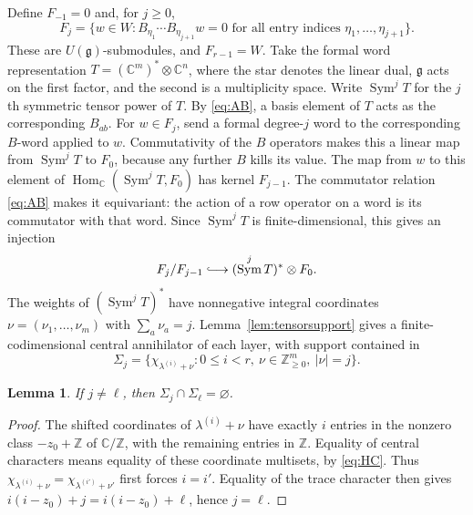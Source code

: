 \documentclass[11pt,a4paper]{article}
\numberwithin{equation}{section}
\newtheorem{lemma}[theorem]{Lemma}
\theoremstyle{definition}
\newcommand{\C}{\mathbb C}
\newcommand{\Z}{\mathbb Z}
\newcommand{\g}{\mathfrak g}
\DeclareMathOperator{\Sym}{Sym}
\begin{document}
Define $F_{-1}=0$ and, for $j\ge0$,
\[
F_j=\{w\in W:B_{\eta_1}\cdots B_{\eta_{j+1}}w=0
                     \text{ for all entry indices }\eta_1,\ldots,\eta_{j+1}\}.
\]
These are $U(\g)$-submodules, and $F_{r-1}=W$.
Take the formal word representation
$T=(\C^m)^*\otimes\C^n$, where the star denotes the linear dual,
$\g$ acts on the first factor, and the second is a multiplicity space.
Write $\Sym^jT$ for the $j$th symmetric tensor power of $T$.
By \eqref{eq:AB}, a basis
element of $T$ acts as the corresponding $B_{ab}$.
For $w\in F_j$, send a formal degree-$j$ word to the corresponding
$B$-word applied to $w$. Commutativity of the $B$ operators makes
this a linear map from $\Sym^jT$ to $F_0$, because any further
$B$ kills its value. The map from $w$ to this element of
$\operatorname{Hom}_\C(\Sym^jT,F_0)$ has kernel $F_{j-1}$.
The commutator relation \eqref{eq:AB} makes it equivariant: the
action of a row operator on a word is its commutator with that
word. Since $\Sym^jT$ is finite-dimensional, this gives an injection
\begin{equation}\label{eq:layerinjection}
F_j/F_{j-1}\lhook\joinrel\longrightarrow
                          (\Sym^jT)^*\otimes F_0.
\end{equation}
The weights of $(\Sym^jT)^*$ have nonnegative integral coordinates
$\nu=(\nu_1,\ldots,\nu_m)$ with $\sum_a\nu_a=j$.
Lemma~\ref{lem:tensorsupport} gives a finite-codimensional central
annihilator of each layer, with support contained in
\begin{equation}\label{eq:Sigma}
\Sigma_j=\{\chi_{\lambda^{(i)}+\nu}:0\le i<r,
                         \ \nu\in\Z_{\ge0}^m,\ |\nu|=j\}.
\end{equation}

\begin{lemma}\label{lem:separation}
If $j\ne\ell$, then $\Sigma_j\cap\Sigma_\ell=\varnothing$.
\end{lemma}
\begin{proof}
The shifted coordinates of $\lambda^{(i)}+\nu$ have exactly $i$
entries in the nonzero class $-z_0+\Z$ of $\C/\Z$, with the
remaining entries in $\Z$. Equality of central characters means
equality of these coordinate multisets, by \eqref{eq:HC}. Thus
$\chi_{\lambda^{(i)}+\nu}=\chi_{\lambda^{(i')}+\nu'}$ first forces
$i=i'$. Equality of the trace character then gives
$i(i-z_0)+j=i(i-z_0)+\ell$, hence $j=\ell$.
\end{proof}
\end{document}
